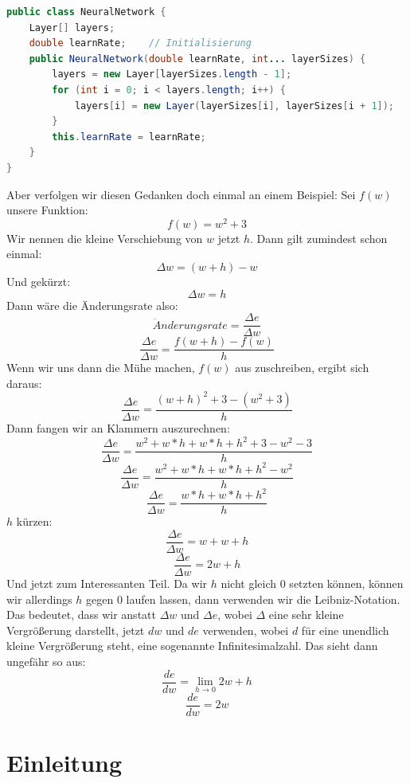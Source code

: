 \documentclass[12pt]{article}
\begin{document}
\begin{lstlisting}[language=Java]
public class NeuralNetwork {
    Layer[] layers;
    double learnRate;    // Initialisierung
    public NeuralNetwork(double learnRate, int... layerSizes) {
        layers = new Layer[layerSizes.length - 1];
        for (int i = 0; i < layers.length; i++) {
            layers[i] = new Layer(layerSizes[i], layerSizes[i + 1]);
        }
        this.learnRate = learnRate;
    }
}
\end{lstlisting}

Aber verfolgen wir diesen Gedanken doch einmal an einem Beispiel:
Sei $f(w)$ unsere Funktion: $$f(w)=w^2+3$$
Wir nennen die kleine Verschiebung von $w$ jetzt $h$.
Dann gilt zumindest schon einmal: $$\Delta w=(w+h)-w$$Und gekürzt:$$\Delta w=h$$
Dann wäre die Änderungsrate also:$$\ddot{A}nderungsrate = \frac{\Delta e}{\Delta w}$$ $$\frac{\Delta e}{\Delta w}=\frac{f(w+h)-f(w)}{h}$$
Wenn wir uns dann die Mühe machen, $f(w)$ aus zuschreiben, ergibt sich daraus:
$$\frac{\Delta e}{\Delta w}=\frac{(w+h)^2+3-(w^2+3)}{h}$$
Dann fangen wir an Klammern auszurechnen:
$$\frac{\Delta e}{\Delta w}=\frac{w^2+w*h+w*h+h^2+3-w^2-3}{h}$$
$$\frac{\Delta e}{\Delta w}=\frac{w^2+w*h+w*h+h^2-w^2}{h}$$
$$\frac{\Delta e}{\Delta w}=\frac{w*h+w*h+h^2}{h}$$
$h$ kürzen:
$$\frac{\Delta e}{\Delta w}=w+w+h$$
$$\frac{\Delta e}{\Delta w}=2w+h$$Und jetzt zum Interessanten Teil. Da wir $h$ nicht gleich 0 setzten können, können wir allerdings $h$ gegen 0 laufen lassen, dann verwenden wir die Leibniz-Notation. Das bedeutet, dass wir anstatt  $\Delta w$ und  $\Delta e$, wobei $\Delta$ eine sehr kleine Vergrößerung darstellt, jetzt $dw$ und $de$ verwenden, wobei $d$ für eine unendlich kleine Vergrößerung steht, eine sogenannte Infinitesimalzahl.
Das sieht dann ungefähr so aus:
$$\frac{de}{dw}=\lim_{h\to 0} 2w +h$$
$$\frac{de}{dw}=2w$$








\section{Einleitung}
\end{document}
